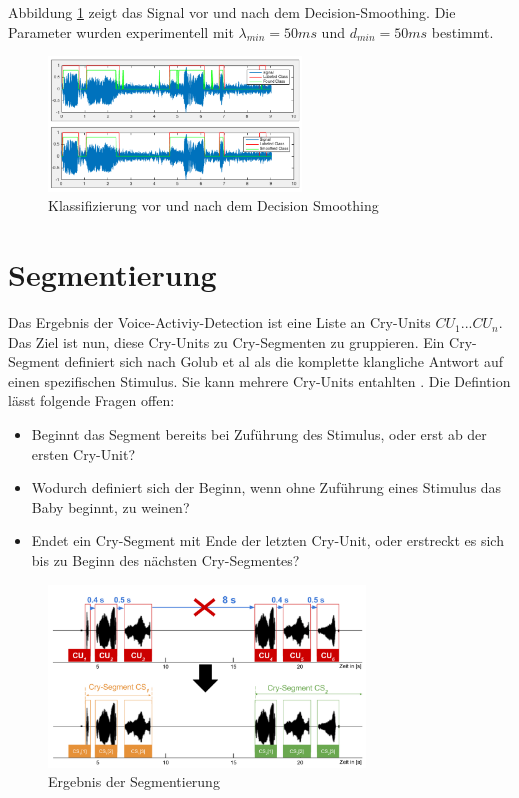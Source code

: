Abbildung \ref{img:after-smoothing} zeigt das Signal vor und nach dem Decision-Smoothing. Die Parameter wurden experimentell mit $\lambda_{min} = 50 ms$ und $d_{min} = 50 ms$ bestimmt.

\begin{figure}[h]
	\centering
	\includegraphics[width=0.6\textwidth]{bilder/smoothing04.png}
	\caption{Klassifizierung vor und nach dem Decision Smoothing}
	\label{img:after-smoothing}
\end{figure}

\section{Segmentierung}
\label{sec:segmenting}
Das Ergebnis der Voice-Activiy-Detection ist eine Liste an Cry-Units  $CU_1 ... CU_n$. Das Ziel ist nun, diese Cry-Units zu Cry-Segmenten zu gruppieren. Ein Cry-Segment definiert sich nach Golub et al \cite{cryModel} als \glqq die komplette klangliche Antwort auf einen spezifischen Stimulus. Sie kann mehrere Cry-Units entahlten \grqq . Die Defintion lässt folgende Fragen offen:

\begin{itemize}[leftmargin=*]
	\item Beginnt das Segment bereits bei Zuführung des Stimulus, oder erst ab der ersten Cry-Unit? 
	\item Wodurch definiert sich der Beginn, wenn ohne Zuführung eines Stimulus das Baby beginnt, zu weinen?
	\item Endet ein Cry-Segment mit Ende der letzten \glqq Cry-Unit\grqq{}, oder erstreckt es sich bis zu Beginn des nächsten Cry-Segmentes?
\end{itemize}

\begin{figure}[h]
	\centering
	\includegraphics[width=0.75\textwidth]{bilder/segmentierung06.png}
	\caption{Ergebnis der Segmentierung}
	\label{img:segmenting03}
\end{figure}



